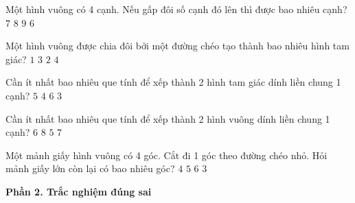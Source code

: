 \begin{ex} %
Một hình vuông có 4 cạnh. Nếu gấp đôi số cạnh đó lên thì được bao nhiêu cạnh?
\choice
{$7$}
{\True $8$}
{$9$}
{$6$}
\end{ex}

\begin{ex} %
Một hình vuông được chia đôi bởi một đường chéo tạo thành bao nhiêu hình tam giác?
\choice
{$1$}
{$3$}
{\True $2$}
{$4$}
\end{ex}

\begin{ex} %
Cần ít nhất bao nhiêu que tính để xếp thành 2 hình tam giác dính liền chung 1 cạnh?
\choice
{\True $5$}
{$4$}
{$6$}
{$3$}
\end{ex}

\begin{ex} %
Cần ít nhất bao nhiêu que tính để xếp thành 2 hình vuông dính liền chung 1 cạnh?
\choice
{$6$}
{$8$}
{$5$}
{\True $7$}
\end{ex}

\begin{ex} %
Một mảnh giấy hình vuông có 4 góc. Cắt đi 1 góc theo đường chéo nhỏ. Hỏi mảnh giấy lớn còn lại có bao nhiêu góc?
\choice
{$4$}
{\True $5$}
{$6$}
{$3$}
\end{ex}

\textbf{Phần 2. Trắc nghiệm đúng sai}

